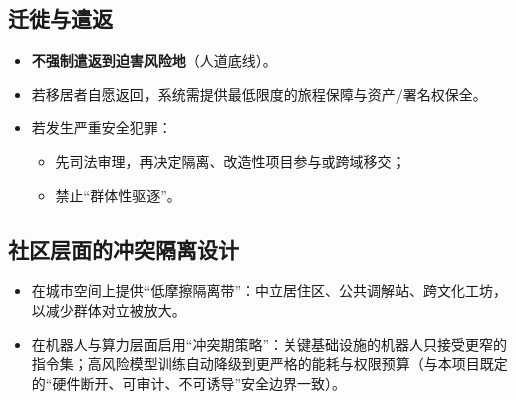 \subsection{迁徙与遣返}\label{ux8fc1ux5f99ux4e0eux9063ux8fd4}

\begin{itemize}
\item
  \textbf{不强制遣返到迫害风险地}（人道底线）。
\item
  若移居者自愿返回，系统需提供最低限度的旅程保障与资产/署名权保全。
\item
  若发生严重安全犯罪：

  \begin{itemize}
  \item
    先司法审理，再决定隔离、改造性项目参与或跨域移交；
  \item
    禁止``群体性驱逐''。
  \end{itemize}
\end{itemize}

\subsection{社区层面的冲突隔离设计}\label{ux793eux533aux5c42ux9762ux7684ux51b2ux7a81ux9694ux79bbux8bbeux8ba1}

\begin{itemize}
\item
  在城市空间上提供``低摩擦隔离带''：中立居住区、公共调解站、跨文化工坊，以减少群体对立被放大。
\item
  在机器人与算力层面启用``冲突期策略''：关键基础设施的机器人只接受更窄的指令集；高风险模型训练自动降级到更严格的能耗与权限预算（与本项目既定的``硬件断开、可审计、不可诱导''安全边界一致）。
\end{itemize}
